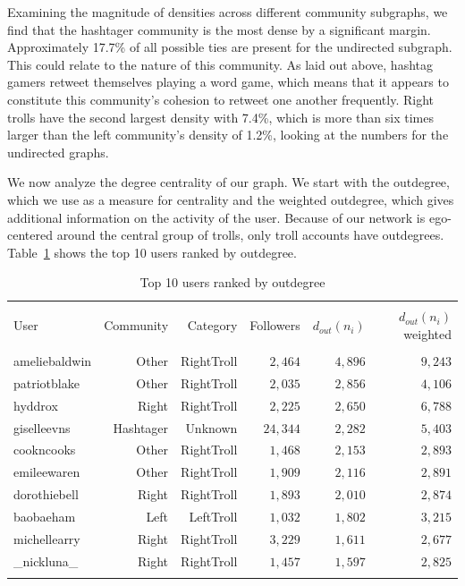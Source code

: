 \documentclass[12pt, titlepage=true, toc=bib]{scrartcl}
\begin{document}
Examining the magnitude of densities across different community subgraphs, we find that the hashtager community is the most dense by a significant margin. Approximately 17.7\% of all possible ties are present for the undirected subgraph. This could relate to the nature of this community. As laid out above, hashtag gamers retweet themselves playing a word game, which means that it appears to constitute this community's cohesion to retweet one another frequently. Right trolls have the second largest density with 7.4\%, which is more than six times larger than the left community's density of 1.2\%, looking at the numbers for the undirected graphs.

We now  analyze the degree centrality of our graph. We start with the outdegree, which we use as a measure for centrality and the weighted outdegree, which gives additional information on the activity of the user. Because of our network is ego-centered around the central group of trolls, only troll accounts have outdegrees. Table~\ref{tab:out} shows the top 10 users ranked by outdegree.

\begin{table}[ht] \centering 
\begin{tabular*}{.95\linewidth}{@{\extracolsep{\fill}} lrrrrr} 
\\[-1.8ex]\hline 
\hline \\[-1.8ex] 
User & Community & Category & Followers & \( d_{out}(n_{i}) \) & \( d_{out}(n_{i}) \) weighted \\ 
\hline \\[-1.8ex] 
ameliebaldwin & Other & RightTroll & $2,464$ & $4,896$ & $9,243$ \\ 
patriotblake & Other & RightTroll & $2,035$ & $2,856$ & $4,106$ \\ 
hyddrox & Right & RightTroll & $2,225$ & $2,650$ & $6,788$ \\ 
giselleevns & Hashtager & Unknown & $24,344$ & $2,282$ & $5,403$ \\ 
cookncooks & Other & RightTroll & $1,468$ & $2,153$ & $2,893$ \\ 
emileewaren & Other & RightTroll & $1,909$ & $2,116$ & $2,891$ \\ 
dorothiebell & Right & RightTroll & $1,893$ & $2,010$ & $2,874$ \\ 
baobaeham & Left & LeftTroll & $1,032$ & $1,802$ & $3,215$ \\ 
michellearry & Right & RightTroll & $3,229$ & $1,611$ & $2,677$ \\ 
\_nickluna\_ & Right & RightTroll & $1,457$ & $1,597$ & $2,825$ \\ 
\hline \\[-1.8ex] 
\end{tabular*} 
  \caption{Top 10 users ranked by outdegree} 
  \label{tab:out} 
\end{table}  
\end{document}
